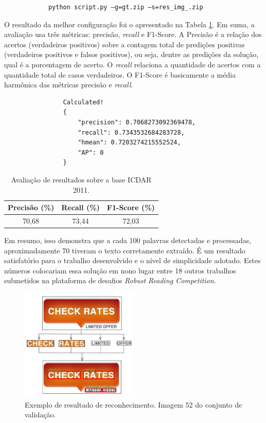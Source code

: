 \begin{verbatim}
            python script.py –g=gt.zip –s=res_img_.zip
\end{verbatim}

O resultado da melhor configuração foi o apresentado na Tabela \ref{tab:icdar11_results}. Em suma, a avaliação usa três 
métricas: precisão, \textit{recall} e F1-Score. A Precisão é a relação dos acertos (verdadeiros positivos) sobre a contagem 
total de predições positivas (verdadeiros positivos e falsos positivos), ou seja, dentre as predições da solução, qual 
é a porcentagem de acerto. O \textit{recall} relaciona a quantidade de acertos com a quantidade total de casos verdadeiros. 
O F1-Score é basicamente a média harmônica das métricas precisão e \textit{recall}.

\begin{verbatim}
                Calculated!
                {
                    "precision": 0.7068273092369478,
                    "recall": 0.7343532684283728,
                    "hmean": 0.7203274215552524, 
                    "AP": 0
                }
\end{verbatim}

\begin{table}[htb]
    \centering
    \caption{Avaliação de resultados sobre a base ICDAR 2011.}
    \begin{tabular}{|c|c|c|}
        \hline
        Precisão (\%) & Recall (\%) & F1-Score (\%) \\
        \hline
        70,68 & 73,44 & 72,03\\
        \hline
    \end{tabular}
    \label{tab:icdar11_results}
\end{table}

Em resumo, isso demonstra que a cada 100 palavras detectadas e processadas, aproximadamente 70 tiveram o texto corretamente 
extraído. É um resultado satisfatório para o trabalho desenvolvido e o nível de simplicidade adotado. Estes números colocariam 
essa solução em nono lugar entre 18 outros trabalhos submetidos na plataforma de desafios \textit{Robust Reading Competition}.

\begin{figure}
    \centering
    \includegraphics[width=0.5\textwidth]{figs/resultados-icdar11-01.png}
    \caption{Exemplo de resultado de reconhecimento. Imagem 52 do conjunto de validação.}
    \label{fig:results_icdar11_01}
\end{figure}

